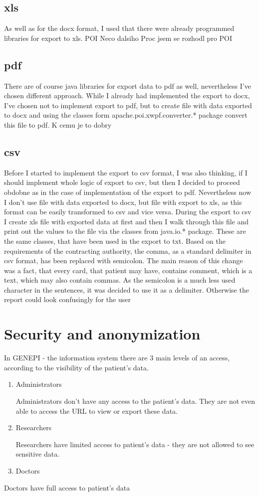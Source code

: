 \documentclass[thesis=B,english]{FITthesis}[2012/10/20]
\begin{document}
\subsection{xls}
As well as for the docx format, I used that there were already programmed libraries for export to xls.
POI 
Neco dalsiho
Proc jsem se rozhodl pro POI
\subsection{pdf}
There are of course java libraries for export data to pdf as well, nevertheless I've chosen different approach. While I already had implemented the export to docx, I've chosen not to implement export to pdf, but to create file with data exported to docx and using the classes form apache.poi.xwpf.converter.* package convert this file to pdf.
K cemu je to dobry
\subsection{csv}
Before I started to implement the export to csv format, I was also thinking, if I should implement whole logic of export to csv, but then I decided to proceed obdobne as in the case of implementation of the export to pdf. Nevertheless now I don't use file with data exported to docx, but file with export to xls, as this format can be easily transformed to csv and vice versa. During the export to csv I create xls file with exported data at first and then I walk through this file and print out the values to the file via the classes from java.io.* package. These are the same classes, that have been used in the export to txt. Based on the requirements of the contracting authority, the comma, as a standard delimiter in csv format, has been replaced with semicolon. The main reason of this change was a fact, that every card, that patient may have, contains comment, which is a text, which may also contain commas. As the semicolon is a much less used character in the sentences, it was decided to use it as a delimiter. Otherwise the report could look confusingly for the user
\section{Security and anonymization}
In GENEPI - the information system there are 3 main levels of an access, according to the visibility of the patient's data.
\begin{enumerate}
\item{Administrators}

Administrators don't have any access to the patient's data. They are not even able to access the URL to view or export these data.
\item{Researchers}

Researchers have limited access to patient's data - they are not allowed to see sensitive data.
\item{Doctors}
\end{enumerate}
Doctors have full access to patient's data
\end{document}
